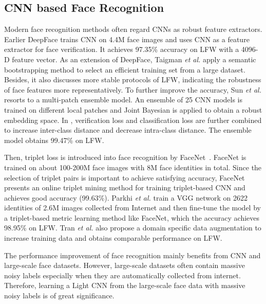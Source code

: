 \documentclass[journal,transmag]{IEEEtran}
\begin{document}
\subsection{CNN based Face Recognition}
Modern face recognition methods often regard CNNs as robust feature extractors.
Earlier DeepFace \cite{taigman2014deepface} trains CNN on 4.4M face images and uses CNN as a feature extractor for face verification.
It achieves 97.35\% accuracy on LFW with a 4096-D feature vector.
As an extension of DeepFace, Taigman \emph{et al.} \cite{taigman2014web} apply a semantic bootstrapping method to select an efficient training set from a large dataset.
Besides, it also discusses more stable protocols \cite{best2014unconstrained} of LFW, indicating the robustness of face features more representatively.
To further improve the accuracy, Sun \emph{et al.} \cite{sun2014deep} resorts to a multi-patch ensemble model.
An ensemble of 25 CNN models is trained on different local patches and Joint Bayesian is applied to obtain a robust embedding space.
In \cite{DBLP:conf/cvpr/SunWT15}, verification loss and classification loss are further combined to increase inter-class distance and decrease intra-class distance.
The ensemble model obtains 99.47\% on LFW.

Then, triplet loss is introduced into face recognition by FaceNet~\cite{schroff2015facenet}.
FaceNet is trained on about 100-200M face images with 8M face identities in total.
Since the selection of triplet pairs is important to achieve satisfying accuracy, FaceNet presents an online triplet mining method for training triplet-based CNN and achieves good accuracy (99.63\%).
Parkhi \emph{et al.} \cite{parkhi2015deep} train a VGG network \cite{simonyan2014very} on 2622 identities of 2.6M images collected from Internet and then fine-tune the model by a triplet-based metric learning method like FaceNet, which the accuracy achieves 98.95\% on LFW. Tran \emph{et al.} \cite{masi2016we} also propose a domain specific data augmentation to increase training data and obtains comparable performance on LFW.

The performance improvement of face recognition mainly benefits from CNN and large-scale face datasets. However, large-scale datasets often contain massive noisy labels especially when they are automatically collected from internet. Therefore, learning a Light CNN from the large-scale face data with massive noisy labels is of great significance.
\end{document}
